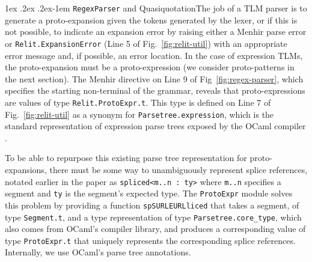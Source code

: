 \documentclass[acmsmall]{acmart}
\makeatletter
\renewcommand{\subsubsection}{%
  \@startsection{subsubsection}{3}%
  {\z@}{1ex \@plus .2ex \@minus .2ex}{-1em}%
  {\normalfont\normalsize\bfseries}%
}
\newcommand{\li}[1]{\lstinline[basicstyle=\ttfamily\fontsize{9pt}{1em}\selectfont]{#1}}
\makeatother
\begin{document}
\subsubsection{\li{RegexParser} and Quasiquotation}\label{sec:regexparser}The job of a TLM parser is to generate a proto-expansion given the tokens generated by the lexer, or if this is not possible, to indicate an expansion error by raising either a Menhir parse error or \li{Relit.ExpansionError} (Line 5 of Fig.~\ref{fig:relit-util}) with an appropriate error message and, if possible, an error location. In the case of expression TLMs, the proto-expansion must be a proto-expression (we consider proto-patterns in the next section). The Menhir directive on Line 9 of Fig~\ref{fig:regex-parser}, which specifies the starting non-terminal of the grammar, reveals that proto-expressions are values of type \li{Relit.ProtoExpr.t}. This type is defined on Line 7 of Fig.~\ref{fig:relit-util} as a synonym for \li{Parsetree.expression}, which is the standard representation of expression parse trees exposed by the OCaml compiler \cite{ocaml-manual}.%

To be able to repurpose this existing parse tree representation for proto-expansions, there must be some way to unambiguously represent splice references, notated earlier in the paper as \li{spliced<m..n : ty>} where \li{m..n} specifies a segment and \li{ty} is the segment's expected type. The \li{ProtoExpr} module solves this problem by providing a function \li{spSURLEURLliced} that takes a segment, of type \li{Segment.t}, and a type representation of type \li{Parsetree.core_type}, which also comes from OCaml's compiler library, and produces a corresponding value of type \li{ProtoExpr.t} that uniquely represents the corresponding splice references. Internally, we use OCaml's parse tree annotations.
\end{document}
